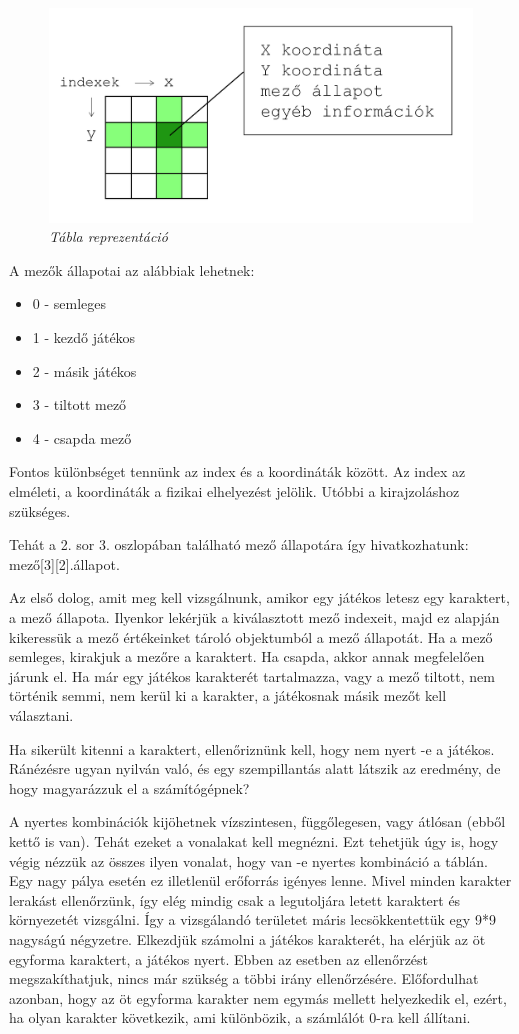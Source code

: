 \begin{figure}[!h]
	\centering
	\includegraphics[width=0.6\linewidth]{kepek/field-representation.png}
	\caption{\textit{Tábla reprezentáció}}
	\label{fig:field-repr}
\end{figure}

A mezők állapotai az alábbiak lehetnek:
\begin{itemize}	
	\item 0 - semleges
	\item 1 - kezdő játékos
	\item 2 - másik játékos
	\item 3 - tiltott mező
	\item 4 - csapda mező
\end{itemize}

Fontos különbséget tennünk az index és a koordináták között. Az index az elméleti, a koordináták a fizikai elhelyezést jelölik. Utóbbi a kirajzoláshoz szükséges.

Tehát a 2. sor 3. oszlopában található mező állapotára így hivatkozhatunk: mező[3][2].állapot.


Az első dolog, amit meg kell vizsgálnunk, amikor egy játékos letesz egy karaktert, a mező állapota. Ilyenkor lekérjük a kiválasztott mező indexeit, majd ez alapján kikeressük a mező értékeinket tároló objektumból a mező állapotát. Ha a mező semleges, kirakjuk a mezőre a karaktert. Ha csapda, akkor annak megfelelően járunk el. Ha már egy játékos karakterét tartalmazza, vagy a mező tiltott, nem történik semmi, nem kerül ki a karakter, a játékosnak másik mezőt kell választani.

Ha sikerült kitenni a karaktert, ellenőriznünk kell, hogy nem nyert -e a játékos. Ránézésre ugyan nyilván való, és egy szempillantás alatt látszik az eredmény, de hogy magyarázzuk el a számítógépnek?

A nyertes kombinációk kijöhetnek vízszintesen, függőlegesen, vagy átlósan (ebből kettő is van). Tehát ezeket a vonalakat kell megnézni. Ezt tehetjük úgy is, hogy végig nézzük az összes ilyen vonalat, hogy van -e nyertes kombináció a táblán. Egy nagy pálya esetén ez illetlenül erőforrás igényes lenne. Mivel minden karakter lerakást ellenőrzünk, így elég mindig csak a legutoljára letett karaktert és környezetét vizsgálni. Így a vizsgálandó területet máris lecsökkentettük egy 9*9 nagyságú négyzetre. Elkezdjük számolni a játékos karakterét, ha elérjük az öt egyforma karaktert, a játékos nyert. Ebben az esetben az ellenőrzést megszakíthatjuk, nincs már szükség a többi irány ellenőrzésére. Előfordulhat azonban, hogy az öt egyforma karakter nem egymás mellett helyezkedik el, ezért, ha olyan karakter következik, ami különbözik, a számlálót 0-ra kell állítani.

